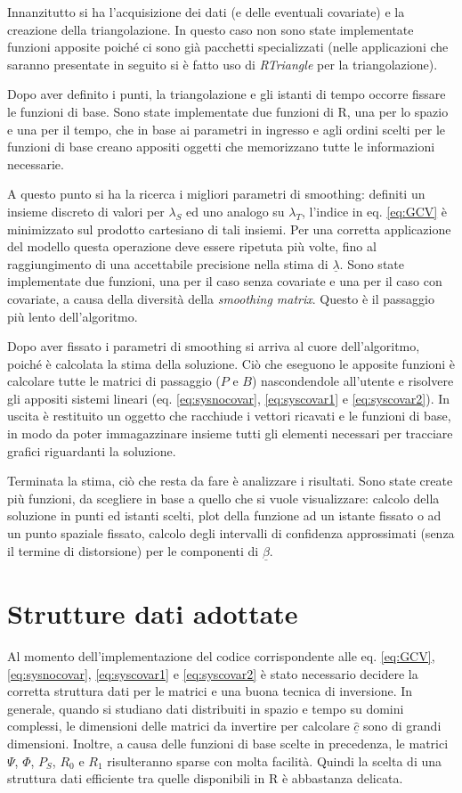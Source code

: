 \documentclass[a4paper,11pt,twoside,openright]{book}							%
\begin{document}
Innanzitutto si ha l'acquisizione dei dati (e delle eventuali covariate) e la creazione della triangolazione. In questo caso non sono state implementate funzioni apposite poiché ci sono già pacchetti specializzati (nelle applicazioni che saranno presentate in seguito si è fatto uso di \textit{RTriangle} per la triangolazione).

Dopo aver definito i punti, la triangolazione e gli istanti di tempo occorre fissare le funzioni di base. Sono state implementate due funzioni di R, una per lo spazio e una per il tempo, che in base ai parametri in ingresso e agli ordini scelti per le funzioni di base creano appositi oggetti che memorizzano tutte le informazioni necessarie.  

A questo punto si ha la ricerca i migliori parametri di smoothing: definiti un insieme discreto di valori per $\lambda_S$ ed uno analogo su $\lambda_T$, l'indice in eq. \ref{eq:GCV} è minimizzato sul prodotto cartesiano di tali insiemi. Per una corretta applicazione del modello questa operazione deve essere ripetuta più volte, fino al raggiungimento di una accettabile precisione nella stima di $\underline{\lambda}$. Sono state implementate due funzioni, una per il caso senza covariate e una per il caso con covariate, a causa della diversità della \textit{smoothing matrix}. Questo è il passaggio più lento dell'algoritmo.

Dopo aver fissato i parametri di smoothing si arriva al cuore dell'algoritmo, poiché è calcolata la stima della soluzione. Ciò che eseguono le apposite funzioni è calcolare tutte le matrici di passaggio ($P$ e $B$) nascondendole all'utente e risolvere gli appositi sistemi lineari (eq. \ref{eq:sysnocovar}, \ref{eq:syscovar1} e \ref{eq:syscovar2}). In uscita è restituito un oggetto che racchiude i vettori ricavati e le funzioni di base, in modo da poter immagazzinare insieme tutti gli elementi necessari per tracciare grafici riguardanti la soluzione.

Terminata la stima, ciò che resta da fare è analizzare i risultati. Sono state create più funzioni, da scegliere in base a quello che si vuole visualizzare: calcolo della soluzione in punti ed istanti scelti, plot della funzione ad un istante fissato o ad un punto spaziale fissato, calcolo degli intervalli di confidenza approssimati (senza il termine di distorsione) per le componenti di $\underline{\beta}$.

\section{Strutture dati adottate}
Al momento dell'implementazione del codice corrispondente alle eq. \ref{eq:GCV}, \ref{eq:sysnocovar}, \ref{eq:syscovar1} e \ref{eq:syscovar2} è stato necessario decidere la corretta struttura dati per le matrici e una buona tecnica di inversione. In generale, quando si studiano dati distribuiti in spazio e tempo su domini complessi, le dimensioni delle matrici da invertire per calcolare $\hat{\underline{c}}$ sono di grandi dimensioni. Inoltre, a causa delle funzioni di base scelte in precedenza, le matrici $\Psi$, $\Phi$, $P_S$, $R_0$ e $R_1$ risulteranno sparse con molta facilità. Quindi la scelta di una struttura dati efficiente tra quelle disponibili in R è abbastanza delicata.
\end{document}
